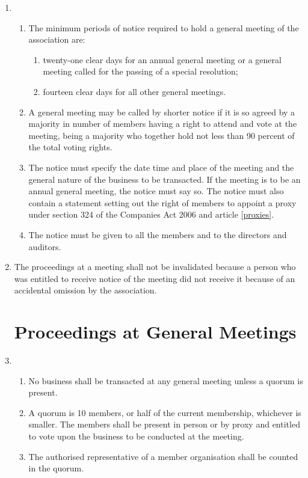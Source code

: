 \begin{enumerate}
\item
  \begin{enumerate}
  \item
    The minimum periods of notice required to hold a general meeting of
    the association are:
    \begin{enumerate}
    \item
      twenty-one clear days for an annual general meeting or a general
      meeting called for the passing of a special resolution;
    \item
      fourteen clear days for all other general meetings.
    \end{enumerate}
  \item
    A general meeting may be called by shorter notice if it is so
    agreed by a majority in number of members having a right to attend
    and vote at the meeting, being a majority who together hold not
    less than 90 percent of the total voting rights.
  \item
    The notice must specify the date time and place of the meeting and
    the general nature of the business to be transacted. If the meeting
    is to be an annual general meeting, the notice must say so. The
    notice must also contain a statement setting out the right of
    members to appoint a proxy under section 324 of the Companies Act
    2006 and article \ref{proxies}.
  \item
    The notice must be given to all the members and to the directors
    and auditors.
  \end{enumerate}

\item
  The proceedings at a meeting shall not be invalidated because a
  person who was entitled to receive notice of the meeting did not
  receive it because of an accidental omission by the association.

\section{Proceedings at General Meetings}

\item
  \begin{enumerate}
  \item
    No business shall be transacted at any general meeting unless a
    quorum is present.
  \item
    A quorum is 10 members, or half of the current membership, whichever is smaller. The members shall be
    present in person or by proxy and entitled to vote upon the business to be conducted at the meeting.
  \item
    The authorised representative of a member organisation shall be
    counted in the quorum.
  \end{enumerate}


\end{enumerate}
